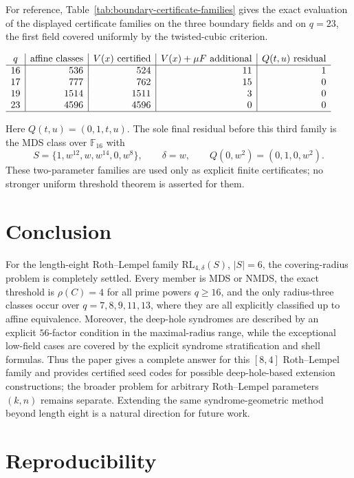 ﻿\documentclass[11pt]{article}
\newcommand{\F}{\mathbb F}
\newcommand{\RL}{\mathrm{RL}}
\theoremstyle{plain}
\theoremstyle{definition}
\begin{document}
For reference, Table~\ref{tab:boundary-certificate-families} gives the
exact evaluation of the displayed certificate families on the three boundary
fields and on \(q=23\), the first field covered uniformly by the
twisted-cubic criterion.
\begin{center}
\label{tab:boundary-certificate-families}
\(
\begin{array}{c|r|r|r|r}
q&\hbox{affine classes}&V(x)\hbox{ certified}&
  V(x)+\mu F\hbox{ additional}&Q(t,u)\hbox{ residual}\\ \hline
16&536&524&11&1\\
17&777&762&15&0\\
19&1514&1511&3&0\\
23&4596&4596&0&0\\
\hline
\end{array}
\)
\end{center}
Here \(Q(t,u)=(0,1,t,u)\).  The sole final residual before this third
family is the MDS class over \(\F_{16}\) with
\[
 S=\{1,w^{12},w,w^{14},0,w^8\},\qquad
 \delta=w,\qquad Q(0,w^2)=(0,1,0,w^2).
\]
These two-parameter families are used only as explicit finite certificates;
no stronger uniform threshold theorem is asserted for them.

\section{Conclusion}

For the length-eight Roth--Lempel family
\(\RL_{4,\delta}(S)\), \(|S|=6\), the covering-radius problem is completely
settled.  Every member is MDS or NMDS, the exact threshold is
\(\rho(C)=4\) for all prime powers \(q\ge16\), and the only radius-three
classes occur over \(q=7,8,9,11,13\), where they are all explicitly
classified up to affine equivalence.  Moreover, the deep-hole syndromes are
described by an explicit \(56\)-factor condition in the maximal-radius
range, while the exceptional low-field cases are covered by the explicit
syndrome stratification and shell formulas.  Thus the paper gives a complete
answer for this \([8,4]\) Roth--Lempel family and provides certified seed
codes for possible deep-hole-based extension constructions; the broader
problem for arbitrary Roth--Lempel parameters \((k,n)\) remains separate.
Extending the same syndrome-geometric method beyond length eight is a natural
direction for future work.

\section{Reproducibility}\label{sec:reproducibility}
\end{document}
